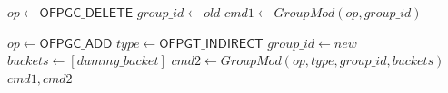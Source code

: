 \documentclass[conference]{sigcomm-alternate}
\begin{document}
\begin{appendix}
\begin{algorithm}[H]
    \caption{$\textit{group-CAS}(old,new)$}
    \label{alg:gcas}
    \begin{algorithmic}[1]

    		\State $op \gets \textsf{OFPGC\_DELETE}$
    		\State $group\_id \gets old$
    		\State $cmd1\gets GroupMod(op, group\_id) $
    		
    		\State $op \gets \textsf{OFPGC\_ADD}$
    		\State $type \gets \textsf{OFPGT\_INDIRECT}$
    		\State $group\_id \gets new$
    		\State $buckets \gets [dummy\_backet]$
    		\State $cmd2\gets GroupMod(op, type, group\_id, buckets) $
			\Return $cmd1,cmd2$
    \end{algorithmic}
\end{algorithm}

\end{appendix}
\end{document}
